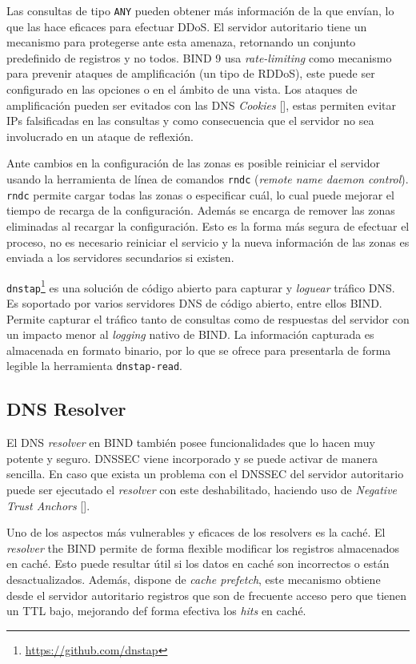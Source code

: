 Las consultas de tipo \verb+ANY+ pueden obtener más información de la que envían, lo que las hace eficaces para efectuar DDoS. El servidor autoritario tiene un mecanismo para protegerse ante esta amenaza, retornando un conjunto predefinido de registros y no todos. BIND 9 usa \textit{rate-limiting} como mecanismo para prevenir ataques de amplificación (un tipo de RDDoS), este puede ser configurado en las opciones o en el ámbito de una vista. Los ataques de amplificación pueden ser evitados con las DNS \textit{Cookies} [\cite{rfc_7873}], estas permiten evitar IPs falsificadas en las consultas y como consecuencia que el servidor no sea involucrado en un ataque de reflexión.

Ante cambios en la configuración de las zonas es posible reiniciar el servidor usando la herramienta de línea de comandos \verb+rndc+ (\textit{remote name daemon control}). \verb+rndc+ permite cargar todas las zonas o especificar cuál, lo cual puede mejorar el tiempo de recarga de la configuración. Además se encarga de remover las zonas eliminadas al recargar la configuración. Esto es la forma más segura de efectuar el proceso, no es necesario reiniciar el servicio y la nueva información de las zonas es enviada a los servidores secundarios si existen.

\verb+dnstap+\footnote{\url{https://github.com/dnstap}} es una solución de código abierto para capturar y \textit{loguear} tráfico DNS. Es soportado por varios servidores DNS de código abierto, entre ellos BIND. Permite capturar el tráfico tanto de consultas como de respuestas del servidor con un impacto menor al \textit{logging} nativo de BIND. La información capturada es almacenada en formato binario, por lo que se ofrece para presentarla de forma legible la herramienta \verb+dnstap-read+. 

\subsection{DNS Resolver}

El DNS \textit{resolver} en BIND también posee funcionalidades que lo hacen muy potente y seguro. DNSSEC viene incorporado y se puede activar de manera sencilla. En caso que exista un problema con el DNSSEC del servidor autoritario puede ser ejecutado el \textit{resolver} con este deshabilitado, haciendo uso de \textit{Negative Trust Anchors} [\cite{rfc_7646}].

Uno de los aspectos más vulnerables y eficaces de los resolvers es la caché. El \textit{resolver} the BIND permite de forma flexible modificar los registros almacenados en caché. Esto puede resultar útil si los datos en caché son incorrectos o están desactualizados. Además, dispone de \textit{cache prefetch}, este mecanismo obtiene desde el servidor autoritario registros que son de frecuente acceso pero que tienen un TTL bajo, mejorando def forma efectiva los \textit{hits} en caché.

